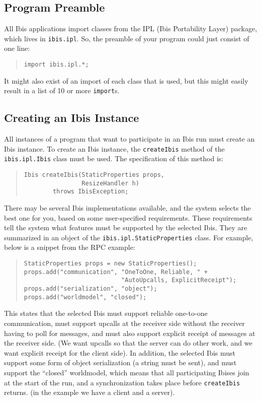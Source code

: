 \documentclass[10pt]{article}
\newcommand{\mysubsection}[1]{\subsection{#1}\label{#1}}
\begin{document}
\subsection{Program Preamble}

All Ibis applications import classes from the IPL (Ibis
Portability Layer) package, which lives in
\verb+ibis.ipl+.
So, the preamble of your program could just consist of one line:
\begin{quote}
\begin{verbatim}
import ibis.ipl.*;
\end{verbatim}
\end{quote}
It might also exist of an import of each class that is used,
but this might easily result in a list of 10 or more \verb+import+s.

\mysubsection{Creating an Ibis Instance}

All instances of a program that want to participate in an Ibis run
must create an Ibis instance.
To create an Ibis instance, the \verb+createIbis+ method of the
\verb+ibis.ipl.Ibis+ class must be used.
The specification of this method is:
\begin{quote}
\begin{verbatim}
Ibis createIbis(StaticProperties props,
                ResizeHandler h)
        throws IbisException;
\end{verbatim}
\end{quote}
There may be several Ibis implementations available, and
the system selects the best one for you, based on some
user-specified requirements.
These requirements tell the system what features must be supported
by the selected Ibis.
They are summarized in an object of the
\verb+ibis.ipl.StaticProperties+ class.
For example, below is a snippet from the RPC example:
\begin{quote}
\begin{verbatim}
StaticProperties props = new StaticProperties();
props.add("communication", "OneToOne, Reliable, " + 
                           "AutoUpcalls, ExplicitReceipt");
props.add("serialization", "object");
props.add("worldmodel", "closed");
\end{verbatim}
\end{quote}
This states that the selected Ibis must support reliable one-to-one
communication, must support upcalls at the receiver side without the
receiver having to poll for messages, and must also support explicit
receipt of messages at the receiver side.
(We want upcalls so that the server can do other work, and we want
explicit receipt for the client side).
In addition, the selected Ibis must support some form of object
serialization (a string must be sent),
and must support the ``closed'' worldmodel, which means
that all participating Ibises join at the start of the run, and a
synchronization takes place before \verb+createIbis+ returns.
(in the example we have a client and a server).
\end{document}

